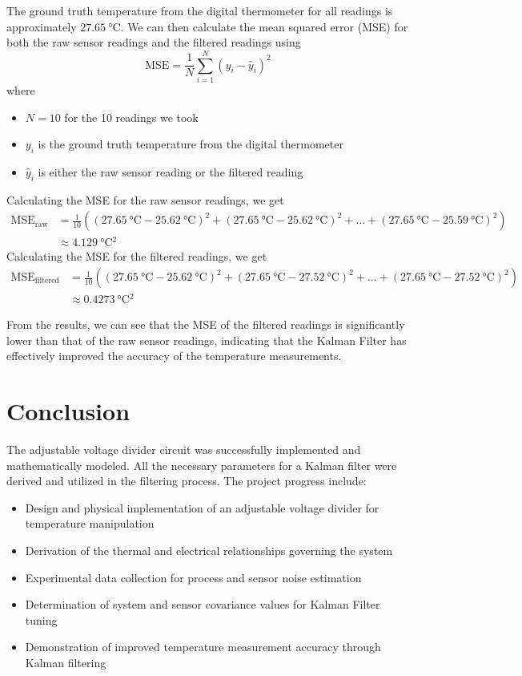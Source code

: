\documentclass[12pt,a4paper]{article}
\begin{document}
The ground truth temperature from the digital thermometer for all readings is approximately $\SI{27.65}{\degreeCelsius}$. We can then calculate the mean squared error (MSE) for both the raw sensor readings and the filtered readings using
\begin{equation*}
    \mathrm{MSE} = \frac{1}{N} \sum_{i=1}^{N} (y_i - \hat{y}_i)^2
\end{equation*}
where
\begin{itemize}
    \item $N=10$ for the 10 readings we took
    \item $y_i$ is the ground truth temperature from the digital thermometer
    \item $\hat{y}_i$ is either the raw sensor reading or the filtered reading
\end{itemize}
Calculating the MSE for the raw sensor readings, we get
\begin{align*}
    \mathrm{MSE}_{\text{raw}} &= \frac{1}{10} \left( (\SI{27.65}{\degreeCelsius} - \SI{25.62}{\degreeCelsius})^2 + (\SI{27.65}{\degreeCelsius} - \SI{25.62}{\degreeCelsius})^2 + \ldots + (\SI{27.65}{\degreeCelsius} - \SI{25.59}{\degreeCelsius})^2 \right) \\
    &\approx \SI{4.129}{\degreeCelsius^2}
\end{align*}
Calculating the MSE for the filtered readings, we get
\begin{align*}
    \mathrm{MSE}_{\text{filtered}} &= \frac{1}{10} \left( (\SI{27.65}{\degreeCelsius} - \SI{25.62}{\degreeCelsius})^2 + (\SI{27.65}{\degreeCelsius} - \SI{27.52}{\degreeCelsius})^2 + \ldots + (\SI{27.65}{\degreeCelsius} - \SI{27.52}{\degreeCelsius})^2 \right) \\
    &\approx \SI{0.4273}{\degreeCelsius^2}
\end{align*}

From the results, we can see that the MSE of the filtered readings is significantly lower than that of the raw sensor readings, indicating that the Kalman Filter has effectively improved the accuracy of the temperature measurements.

\section{Conclusion}
The adjustable voltage divider circuit was successfully implemented and mathematically modeled. All the necessary parameters for a Kalman filter were derived and utilized in the filtering process. The project progress include:
\begin{itemize}
\item Design and physical implementation of an adjustable voltage divider for temperature manipulation
\item Derivation of the thermal and electrical relationships governing the system
\item Experimental data collection for process and sensor noise estimation
\item Determination of system and sensor covariance values for Kalman Filter tuning
\item Demonstration of improved temperature measurement accuracy through Kalman filtering
\end{itemize}
\end{document}
